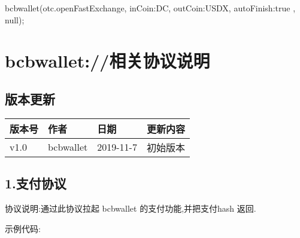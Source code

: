 \documentclass[letterpaper,10pt,english]{sphinxmanual}
\begin{document}
\begin{sphinxVerbatim}[commandchars=\\\{\}]
bcbwallet(\PYGZsq{}otc.openFastExchange\PYGZsq{}, \PYGZob{}
    \PYGZdq{}inCoin\PYGZdq{}:\PYGZdq{}DC\PYGZdq{},
    \PYGZdq{}outCoin\PYGZdq{}:\PYGZdq{}USDX\PYGZdq{},
    \PYGZdq{}autoFinish\PYGZdq{}:true
\PYGZcb{}, null);
\end{sphinxVerbatim}


\chapter{bcbwallet://相关协议说明}
\label{\detokenize{bcbwallet protocol:bcbwallet}}\label{\detokenize{bcbwallet protocol::doc}}

\section{版本更新}
\label{\detokenize{bcbwallet protocol:id1}}

\begin{savenotes}\sphinxattablestart
\centering
\begin{tabulary}{\linewidth}[t]{|T|T|T|T|}
\hline
\sphinxstyletheadfamily 
版本号
&\sphinxstyletheadfamily 
作者
&\sphinxstyletheadfamily 
日期
&\sphinxstyletheadfamily 
更新内容
\\
\hline
v1.0
&
bcbwallet
&
2019-11-7
&
初始版本
\\
\hline
\end{tabulary}
\par
\sphinxattableend\end{savenotes}


\section{1.支付协议}
\label{\detokenize{bcbwallet protocol:id2}}
\begin{sphinxVerbatim}[commandchars=\\\{\}]
\end{sphinxVerbatim}

协议说明:通过此协议拉起 bcbwallet 的支付功能,并把支付hash 返回.

示例代码:
\end{document}
